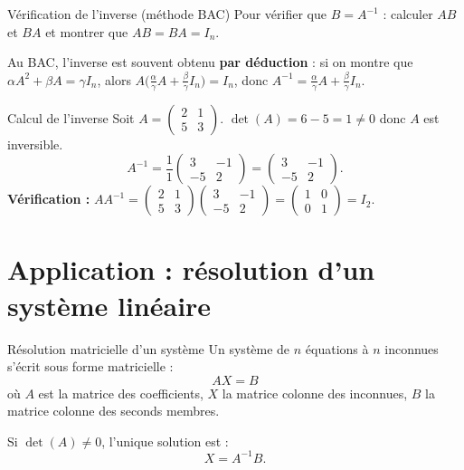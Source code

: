 \begin{methode}{Vérification de l'inverse (méthode BAC)}
	Pour vérifier que $B=A^{-1}$ : calculer $AB$ et $BA$ et montrer
	que $AB = BA = I_n$.
\end{methode}

\begin{astuce}
	Au BAC, l'inverse est souvent obtenu \textbf{par déduction} :
	si on montre que $\alpha A^2 + \beta A = \gamma I_n$,
	alors $A\bigl(\frac{\alpha}{\gamma}A + \frac{\beta}{\gamma}I_n\bigr) = I_n$,
	donc $A^{-1} = \frac{\alpha}{\gamma}A + \frac{\beta}{\gamma}I_n$.
\end{astuce}

\begin{exemple}{Calcul de l'inverse}
	Soit $A = \begin{pmatrix}2&1\\5&3\end{pmatrix}$.
	$\det(A)=6-5=1\neq 0$ donc $A$ est inversible.
	\[
	A^{-1} = \frac{1}{1}\begin{pmatrix}3&-1\\-5&2\end{pmatrix}
	= \begin{pmatrix}3&-1\\-5&2\end{pmatrix}.
	\]
	\textbf{Vérification :}
	$AA^{-1}=\begin{pmatrix}2&1\\5&3\end{pmatrix}\begin{pmatrix}3&-1\\-5&2\end{pmatrix}
	=\begin{pmatrix}1&0\\0&1\end{pmatrix}=I_2.$ \checkmark
\end{exemple}

\section{Application : résolution d'un système linéaire}

\begin{methode}{Résolution matricielle d'un système}
	Un système de $n$ équations à $n$ inconnues s'écrit sous forme matricielle :
	\[
	AX = B
	\]
	où $A$ est la matrice des coefficients, $X$ la matrice colonne des inconnues,
	$B$ la matrice colonne des seconds membres.
	
	Si $\det(A)\neq 0$, l'unique solution est :
	\[
	\boxed{X = A^{-1}B.}
	\]
\end{methode}

